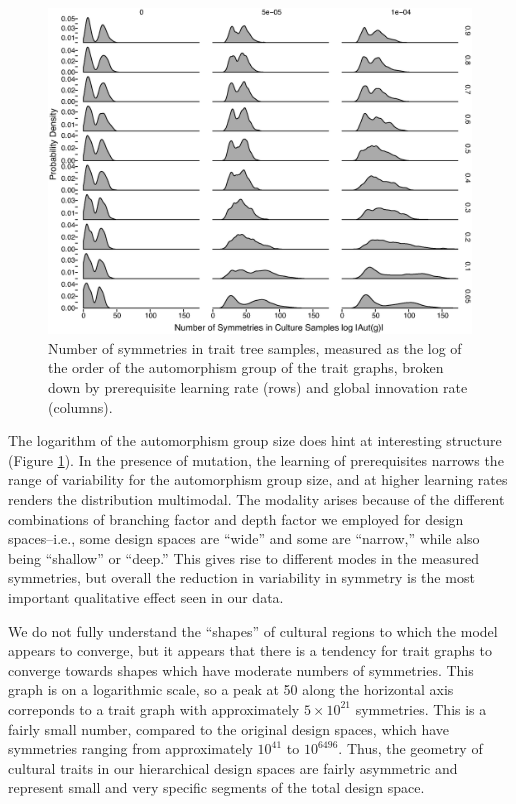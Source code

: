 \begin{figure}[h] 
\centering 
\includegraphics[scale=0.4]{graphics/semanticaxelrod/autgroupsize-by-learning-by-innovation.eps} 
\caption{Number of symmetries in trait tree samples, measured as the log of the order of the automorphism group of the trait graphs, broken down by prerequisite learning rate (rows) and global innovation rate (columns).} 
\label{semax:img:autgsize} 
\end{figure}

The logarithm of the automorphism group size does hint at interesting
structure (Figure \ref{semax:img:autgsize}). In the presence of mutation, the
learning of prerequisites narrows the range of variability for the
automorphism group size, and at higher learning rates renders the
distribution multimodal. The modality arises because of the different
combinations of branching factor and depth factor we employed for design
spaces--i.e., some design spaces are ``wide'' and some are ``narrow,''
while also being ``shallow'' or ``deep.'' This gives rise to different
modes in the measured symmetries, but overall the reduction in
variability in symmetry is the most important qualitative effect seen in
our data.

We do not fully understand the ``shapes'' of cultural regions to which
the model appears to converge, but it appears that there is a tendency
for trait graphs to converge towards shapes which have moderate numbers
of symmetries. This graph is on a logarithmic scale, so a peak at 50
along the horizontal axis correponds to a trait graph with approximately
$5 \times 10^{21}$ symmetries. This is a fairly small number, compared
to the original design spaces, which have symmetries ranging from
approximately $10^{41}$ to $10^{6496}$. Thus, the geometry of cultural
traits in our hierarchical design spaces are fairly asymmetric and
represent small and very specific segments of the total design space.

